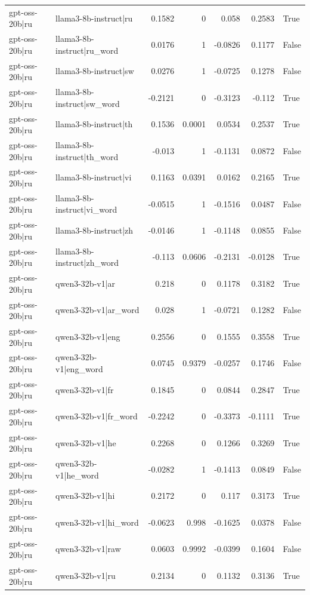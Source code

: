 \begin{table}
\begin{tabular}{l l r r r r l}
gpt-oss-20b|ru & llama3-8b-instruct|ru & 0.1582 & 0 & 0.058 & 0.2583 & True \\
gpt-oss-20b|ru & llama3-8b-instruct|ru_word & 0.0176 & 1 & -0.0826 & 0.1177 & False \\
gpt-oss-20b|ru & llama3-8b-instruct|sw & 0.0276 & 1 & -0.0725 & 0.1278 & False \\
gpt-oss-20b|ru & llama3-8b-instruct|sw_word & -0.2121 & 0 & -0.3123 & -0.112 & True \\
gpt-oss-20b|ru & llama3-8b-instruct|th & 0.1536 & 0.0001 & 0.0534 & 0.2537 & True \\
gpt-oss-20b|ru & llama3-8b-instruct|th_word & -0.013 & 1 & -0.1131 & 0.0872 & False \\
gpt-oss-20b|ru & llama3-8b-instruct|vi & 0.1163 & 0.0391 & 0.0162 & 0.2165 & True \\
gpt-oss-20b|ru & llama3-8b-instruct|vi_word & -0.0515 & 1 & -0.1516 & 0.0487 & False \\
gpt-oss-20b|ru & llama3-8b-instruct|zh & -0.0146 & 1 & -0.1148 & 0.0855 & False \\
gpt-oss-20b|ru & llama3-8b-instruct|zh_word & -0.113 & 0.0606 & -0.2131 & -0.0128 & True \\
gpt-oss-20b|ru & qwen3-32b-v1|ar & 0.218 & 0 & 0.1178 & 0.3182 & True \\
gpt-oss-20b|ru & qwen3-32b-v1|ar_word & 0.028 & 1 & -0.0721 & 0.1282 & False \\
gpt-oss-20b|ru & qwen3-32b-v1|eng & 0.2556 & 0 & 0.1555 & 0.3558 & True \\
gpt-oss-20b|ru & qwen3-32b-v1|eng_word & 0.0745 & 0.9379 & -0.0257 & 0.1746 & False \\
gpt-oss-20b|ru & qwen3-32b-v1|fr & 0.1845 & 0 & 0.0844 & 0.2847 & True \\
gpt-oss-20b|ru & qwen3-32b-v1|fr_word & -0.2242 & 0 & -0.3373 & -0.1111 & True \\
gpt-oss-20b|ru & qwen3-32b-v1|he & 0.2268 & 0 & 0.1266 & 0.3269 & True \\
gpt-oss-20b|ru & qwen3-32b-v1|he_word & -0.0282 & 1 & -0.1413 & 0.0849 & False \\
gpt-oss-20b|ru & qwen3-32b-v1|hi & 0.2172 & 0 & 0.117 & 0.3173 & True \\
gpt-oss-20b|ru & qwen3-32b-v1|hi_word & -0.0623 & 0.998 & -0.1625 & 0.0378 & False \\
gpt-oss-20b|ru & qwen3-32b-v1|raw & 0.0603 & 0.9992 & -0.0399 & 0.1604 & False \\
gpt-oss-20b|ru & qwen3-32b-v1|ru & 0.2134 & 0 & 0.1132 & 0.3136 & True \\

\end{tabular}
\end{table}
